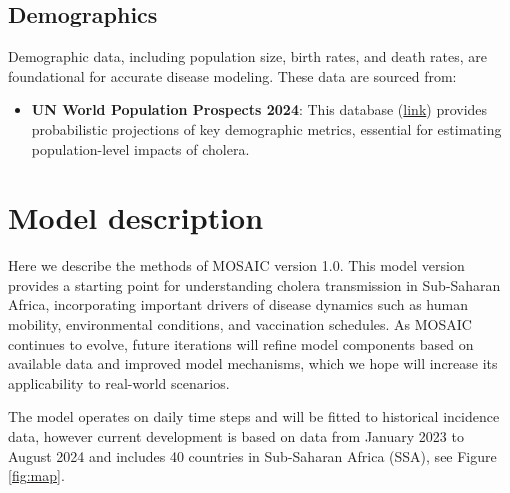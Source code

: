 \documentclass[
]{book}
\providecommand{\tightlist}{%
  \setlength{\itemsep}{0pt}\setlength{\parskip}{0pt}}
\begin{document}
\section{Demographics}\label{demographics}

Demographic data, including population size, birth rates, and death rates, are foundational for accurate disease modeling. These data are sourced from:

\begin{itemize}
\tightlist
\item
  \textbf{UN World Population Prospects 2024}: This database (\href{https://population.un.org/wpp/Download/}{link}) provides probabilistic projections of key demographic metrics, essential for estimating population-level impacts of cholera.
\end{itemize}

\chapter{Model description}\label{model-description}

Here we describe the methods of MOSAIC version 1.0. This model version provides a starting point for understanding cholera transmission in Sub-Saharan Africa, incorporating important drivers of disease dynamics such as human mobility, environmental conditions, and vaccination schedules. As MOSAIC continues to evolve, future iterations will refine model components based on available data and improved model mechanisms, which we hope will increase its applicability to real-world scenarios.

The model operates on daily time steps and will be fitted to historical incidence data, however current development is based on data from January 2023 to August 2024 and includes 40 countries in Sub-Saharan Africa (SSA), see Figure \ref{fig:map}.
\end{document}
